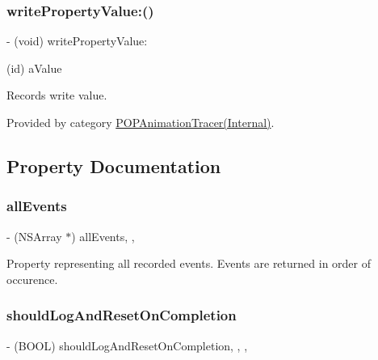 \subsubsection{\texorpdfstring{write\+Property\+Value\+:()}{writePropertyValue:()}\hspace{0.1cm}{\footnotesize\ttfamily [2/2]}}
{\footnotesize\ttfamily -\/ (void) write\+Property\+Value\+: \begin{DoxyParamCaption}\item[{(id)}]{a\+Value }\end{DoxyParamCaption}}

Records write value. 

Provided by category \mbox{\hyperlink{category_p_o_p_animation_tracer_07_internal_08_aa703f72cf374b9f6feb44c0fe8d508d9}{P\+O\+P\+Animation\+Tracer(\+Internal)}}.



\subsection{Property Documentation}
\mbox{\label{interface_p_o_p_animation_tracer_a2cdf7bf33c46077a8d22c300571d2779}} 
\subsubsection{\texorpdfstring{all\+Events}{allEvents}}
{\footnotesize\ttfamily -\/ (N\+S\+Array $\ast$) all\+Events\hspace{0.3cm}{\ttfamily [read]}, {\ttfamily [nonatomic]}, {\ttfamily [assign]}}

Property representing all recorded events.  Events are returned in order of occurence. \mbox{\label{interface_p_o_p_animation_tracer_ae988e06b77d323a6fe299da1d0b78d44}} 
\subsubsection{\texorpdfstring{should\+Log\+And\+Reset\+On\+Completion}{shouldLogAndResetOnCompletion}}
{\footnotesize\ttfamily -\/ (B\+O\+OL) should\+Log\+And\+Reset\+On\+Completion\hspace{0.3cm}{\ttfamily [read]}, {\ttfamily [write]}, {\ttfamily [nonatomic]}, {\ttfamily [assign]}}

